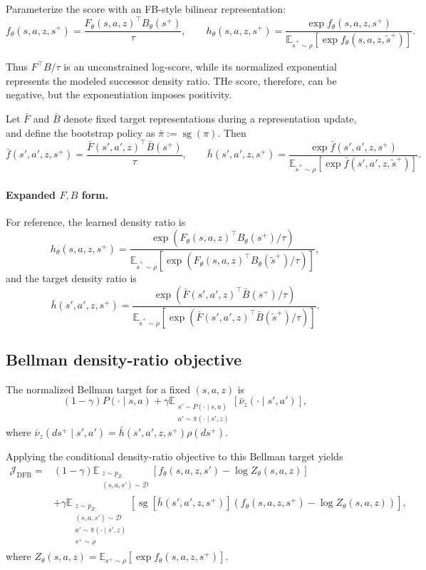 \documentclass[11pt]{article}
\newcommand{\sg}{\operatorname{sg}}
\begin{document}
Parameterize the score with an FB-style bilinear representation:
\begin{equation}
    f_\theta(s,a,z,s^+) = \frac{F_\theta(s,a,z)^\top B_\theta(s^+)}{\tau}, \qquad h_\theta(s,a,z,s^+) = \frac{\exp f_\theta(s,a,z,s^+)}{\mathbb E_{\tilde s^+\sim\rho}[\exp f_\theta(s,a,z,\tilde s^+)]}.
    \label{eq:dfb-density}
\end{equation}

Thus $F^\top B/\tau$ is an unconstrained log-score, while its normalized exponential represents the modeled successor density ratio. 
THe score, therefore, can be negative, but the exponentiation imposes positivity.

Let $\bar F$ and $\bar B$ denote fixed target representations during a representation update, and define the bootstrap policy as $\bar\pi:=\sg(\pi)$. Then
\[
    \bar f(s',a',z,s^+) = \frac{\bar F(s',a',z)^\top\bar B(s^+)}{\tau}, \qquad \bar h(s',a',z,s^+) = \frac{\exp\bar f(s',a',z,s^+)}{\mathbb E_{\tilde s^+\sim\rho}[\exp\bar f(s',a',z,\tilde s^+)]}.
\]

\paragraph{Expanded $F,B$ form.}
For reference, the learned density ratio is
\[
    h_\theta(s,a,z,s^+) = \frac{\exp\left(F_\theta(s,a,z)^\top B_\theta(s^+)/\tau\right)}{\mathbb E_{\tilde s^+\sim\rho}\left[\exp\left(F_\theta(s,a,z)^\top B_\theta(\tilde s^+)/\tau\right)\right]},
\]
and the target density ratio is
\[
    \bar h(s',a',z,s^+) = \frac{\exp\left(\bar F(s',a',z)^\top\bar B(s^+)/\tau\right)}{\mathbb E_{\tilde s^+\sim\rho}\left[\exp\left(\bar F(s',a',z)^\top\bar B(\tilde s^+)/\tau\right)\right]}.
\]

\subsection{Bellman density-ratio objective}

The normalized Bellman target for a fixed $(s,a,z)$ is
\[
    (1-\gamma)P(\cdot\mid s,a) + \gamma\mathbb E_{\substack{s'\sim P(\cdot\mid s,a)\\a'\sim\bar\pi(\cdot\mid s',z)}}[\bar\nu_z(\cdot\mid s',a')],
\]
where $\bar\nu_z(ds^+\mid s',a')=\bar h(s',a',z,s^+)\rho(ds^+)$.

Applying the conditional density-ratio objective to this Bellman target yields
\[
\begin{aligned}
    \mathcal J_{\mathrm{DFB}} ={}& (1-\gamma)\mathbb E_{\substack{z\sim p_Z\\(s,a,s')\sim\mathcal D}}\left[f_\theta(s,a,z,s')-\log Z_\theta(s,a,z)\right] \\
    &+ \gamma\mathbb E_{\substack{z\sim p_Z\\(s,a,s')\sim\mathcal D\\a'\sim\bar\pi(\cdot\mid s',z)\\s^+\sim\rho}}\left[\sg\!\left[\bar h(s',a',z,s^+)\right]\left(f_\theta(s,a,z,s^+)-\log Z_\theta(s,a,z)\right)\right],
\end{aligned}
\]
where $Z_\theta(s,a,z)=\mathbb E_{s^+\sim\rho}[\exp f_\theta(s,a,z,s^+)]$.
\end{document}
